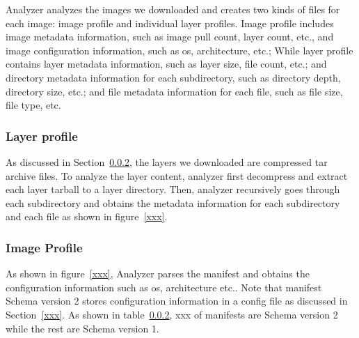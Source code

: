 Analyzer analyzes the images we downloaded and creates two kinds of files for each image: image profile and individual layer profiles.
%
Image profile includes image metadata information, such as image pull count, layer count, etc., and image configuration information, such as os, architecture, etc.; While layer profile contains layer metadata information, such as layer size, file count, etc.; and directory metadata information for each subdirectory, such as directory depth, directory size, etc.; and file metadata information for each file, such as file size, file type, etc.
%


\subsubsection{Layer profile}

As discussed in Section~\ref{}, the layers we downloaded are compressed tar archive files.
%
To analyze the layer content, analyzer first decompress and extract each layer tarball to a layer directory.
%
Then, analyzer recursively goes through each subdirectory and obtains the metadata information for each subdirectory and each file as shown in figure~\ref{xxx}.
%







\subsubsection{Image Profile}

As shown in figure~\ref{xxx}, Analyzer parses the manifest and obtains the configuration information such as os, architecture etc..
%
Note that manifest Schema version 2 stores configuration information in a config file as discussed in Section~\ref{xxx}.
%
As shown in table~\ref{}, xxx of manifests are Schema version 2 while the rest are Schema version 1. 

